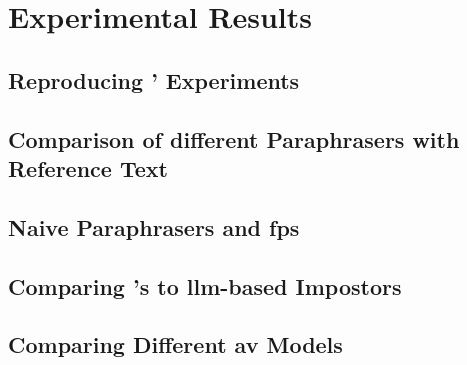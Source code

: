\chapter{Experimental Results}
\label{chap:experimental_results}

\section{Reproducing \citet{koppel_determining_2014}' Experiments}



\section{Comparison of different Paraphrasers with Reference Text}

\section{Naive Paraphrasers and \acp{fp}}

\section{Comparing \citet{koppel_determining_2014}'s to \ac{llm}-based Impostors}

\section{Comparing Different \ac{av} Models}
